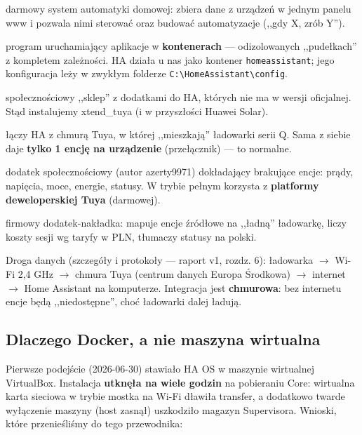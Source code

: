 \documentclass[11pt,a4paper]{article}
\begin{document}
\begin{description}[style=nextline]
\item[Home Assistant (HA)] darmowy system automatyki domowej: zbiera dane z urządzeń w jednym panelu www i pozwala nimi sterować oraz budować automatyzacje (,,gdy X, zrób Y'').
\item[Docker Desktop] program uruchamiający aplikacje w \textbf{kontenerach} --- odizolowanych ,,pudełkach'' z kompletem zależności. HA działa u nas jako kontener \texttt{homeassistant}; jego konfiguracja leży w zwykłym folderze \texttt{C:\textbackslash HomeAssistant\textbackslash config}.
\item[HACS] społecznościowy ,,sklep'' z dodatkami do HA, których nie ma w wersji oficjalnej. Stąd instalujemy xtend\_tuya (i w przyszłości Huawei Solar).
\item[Integracja Tuya (oficjalna)] łączy HA z chmurą Tuya, w której ,,mieszkają'' ładowarki serii Q. Sama z siebie daje \textbf{tylko 1 encję na urządzenie} (przełącznik) --- to normalne.
\item[xtend\_tuya] dodatek społecznościowy (autor azerty9971) dokładający brakujące encje: prądy, napięcia, moce, energie, statusy. W trybie pełnym korzysta z \textbf{platformy deweloperskiej Tuya} (darmowej).
\item[TuyaExtend AmperePoint] firmowy dodatek-nakładka: mapuje encje źródłowe na ,,ładną'' ładowarkę, liczy koszty sesji wg taryfy w PLN, tłumaczy statusy na polski.
\end{description}

Droga danych (szczegóły i protokoły --- raport v1, rozdz. 6): ładowarka $\to$ Wi-Fi 2,4 GHz $\to$ chmura Tuya (centrum danych Europa Środkowa) $\to$ internet $\to$ Home Assistant na komputerze. Integracja jest \textbf{chmurowa}: bez internetu encje będą ,,niedostępne'', choć ładowarki dalej ładują.

\subsection{Dlaczego Docker, a nie maszyna wirtualna}
\label{sec:dlaczego-docker}

Pierwsze podejście (2026-06-30) stawiało HA OS w maszynie wirtualnej VirtualBox. Instalacja \textbf{utknęła na wiele godzin} na pobieraniu Core: wirtualna karta sieciowa w trybie mostka na Wi-Fi dławiła transfer, a dodatkowo twarde wyłączenie maszyny (host zasnął) uszkodziło magazyn Supervisora. Wnioski, które przenieśliśmy do tego przewodnika:
\end{document}
